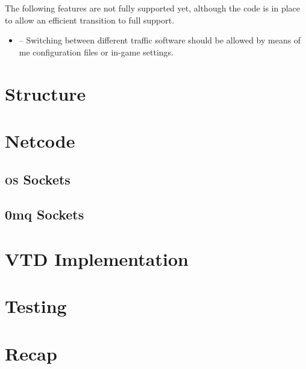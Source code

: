The following \glspl{feature} are not fully supported yet, although the code is in place to allow an efficient transition to full support.

\begin{itemize}
	\item {} -- Switching between different traffic software should be allowed by means of \gls{me} configuration files or in-game settings.
\end{itemize}

\section{Structure}\label{sc:middleware:structure}

\section{Netcode}\label{sc:middleware:netcode}

\subsection{\textsc{os} Sockets}

\subsection{0mq Sockets}

\section{VTD Implementation}\label{sc:middleware:implementation}

\section{Testing}\label{sc:middleware:testing}

\section{Recap}\label{sc:middleware:recap}

